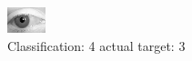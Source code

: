\begin{figure}[h!]
\begin{center}
\includegraphics[width=0.60\columnwidth]{figures/ID2806_class_4_target_3.png}
\end{center}
\caption{ Classification: 4 actual target: 3}
\label{fig:ID2806_class_4_target_3}
\end{figure}
